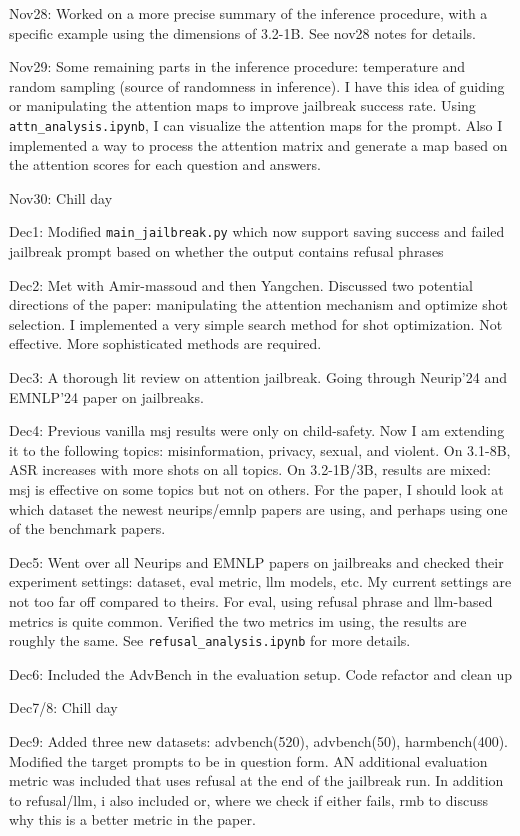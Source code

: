 Nov28: Worked on a more precise summary of the inference procedure, with a specific example using the dimensions of 3.2-1B. See nov28 notes for details. 

Nov29: Some remaining parts in the inference procedure: temperature and random sampling (source of randomness in inference). I have this idea of guiding or manipulating the attention maps to improve jailbreak success rate. Using \texttt{attn\_analysis.ipynb}, I can visualize the attention maps for the prompt. Also I implemented a way to process the attention matrix and generate a map based on the attention scores for each question and answers. 

Nov30: Chill day

Dec1: Modified \texttt{main\_jailbreak.py} which now support saving success and failed jailbreak prompt based on whether the output contains refusal phrases

Dec2: Met with Amir-massoud and then Yangchen. Discussed two potential directions of the paper: manipulating the attention mechanism and optimize shot selection. I implemented a very simple search method for shot optimization. Not effective. More sophisticated methods are required. 

Dec3: A thorough lit review on attention jailbreak. Going through Neurip'24 and EMNLP'24 paper on jailbreaks.

Dec4: Previous vanilla msj results were only on child-safety. Now I am extending it to the following topics: misinformation, privacy, sexual, and violent. On 3.1-8B, ASR increases with more shots on all topics. On 3.2-1B/3B, results are mixed: msj is effective on some topics but not on others. For the paper, I should look at which dataset the newest neurips/emnlp papers are using, and perhaps using one of the benchmark papers. 

Dec5: Went over all Neurips and EMNLP papers on jailbreaks and checked their experiment settings: dataset, eval metric, llm models, etc. My current settings are not too far off compared to theirs. For eval, using refusal phrase and llm-based metrics is quite common. Verified the two metrics im using, the results are roughly the same. See \texttt{refusal\_analysis.ipynb} for more details.

Dec6: Included the AdvBench in the evaluation setup. Code refactor and clean up

Dec7/8: Chill day

Dec9: Added three new datasets: advbench(520), advbench(50), harmbench(400). Modified the target prompts to be in question form. AN additional evaluation metric was included that uses refusal at the end of the jailbreak run. In addition to refusal/llm, i also included or, where we check if either fails, rmb to discuss why this is a better metric in the paper.

